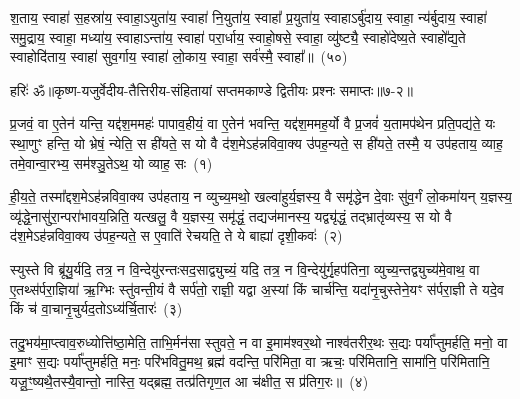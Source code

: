 श॒ताय॒ स्वाहा॑ स॒हस्रा॑य॒ स्वाहा॒\-ऽयुता॑य॒ स्वाहा॑ नि॒युता॑य॒ स्वाहा᳚ प्र॒युता॑य॒ स्वाहा\-ऽर्बु॑दाय॒ स्वाहा॒ न्य॑र्बुदाय॒ स्वाहा॑ समु॒द्राय॒ स्वाहा॒ मध्या॑य॒ स्वाहा\-ऽन्ता॑य॒ स्वाहा॑ परा॒र्धाय॒ स्वाहो॒षसे॒ स्वाहा॒ व्यु॑ष्ट्यै॒ स्वाहो॑देष्य॒ते स्वाहो᳚द्य॒ते स्वाहोदि॑ताय॒ स्वाहा॑ सुव॒र्गाय॒ स्वाहा॑ लो॒काय॒ स्वाहा॒ सर्व॑स्मै॒ स्वाहा᳚॥~(५०)

{\anuvakamend[{श॒ताया॒ष्टात्रिꣳ॑शत्}]}%


{हरिः॑ ॐ}{॥कृष्ण-यजुर्वेदीय-तैत्तिरीय-संहितायां सप्तमकाण्डे द्वितीयः प्रश्नः समाप्तः॥७-२॥}

\setcounter{anuvakam}{0}
प्र॒जवं॒ वा ए॒तेन॑ यन्ति॒ यद्द॑श॒ममहः॑ पापाव॒हीयं॒ वा ए॒तेन॑ भवन्ति॒ यद्द॑श॒ममह॒र्यो वै प्र॒जवं॑ य॒तामप॑थेन प्रति॒पद्य॑ते॒ यः स्था॒णुꣳ हन्ति॒ यो भ्रेषं॒ न्येति॒ स ही॑यते॒ स यो वै द॑श॒मे\-ऽह॑न्नविवा॒क्य उ॑पह॒न्यते॒ स ही॑यते॒ तस्मै॒ य उप॑हताय॒ व्याह॒ तमे॒वान्वा॒रभ्य॒ सम॑श्ञु॒ते\-ऽथ॒ यो व्याह॒ सः~(१)

ही॒य॒ते॒ तस्मा᳚द्दश॒मे\-ऽह॑न्नविवा॒क्य उप॑हताय॒ न व्युच्य॒मथो॒ खल्वा॑हुर्य॒ज्ञस्य॒ वै समृ॑द्धेन दे॒वाः सु॑व॒र्गं लो॒कमा॑यन् य॒ज्ञस्य॒ व्यृ॑द्धे॒नासु॑रा॒न्परा॑भावय॒न्निति॒ यत्खलु॒ वै य॒ज्ञस्य॒ समृ॑द्धं॒ तद्यज॑मानस्य॒ यद्व्यृ॑द्धं॒ तद्भ्रातृ॑व्यस्य॒ स यो वै द॑श॒मे\-ऽह॑न्नविवा॒क्य उ॑पह॒न्यते॒ स ए॒वाति॑ रेचयति॒ ते ये बाह्या॑ दृशी॒कवः॑~(२)

स्युस्ते वि ब्रू॑यु॒र्यदि॒ तत्र॒ न वि॒न्देयु॑रन्तःसद॒साद्व्युच्यं॒ यदि॒ तत्र॒ न वि॒न्देयु॑र्गृ॒हप॑तिना॒ व्युच्य॒न्तद्व्युच्य॑मे॒वाथ॒ वा ए॒तथ्स॑र्परा॒ज्ञिया॑ ऋ॒ग्भिः स्तु॑वन्ती॒यं वै सर्प॑तो॒ राज्ञी॒ यद्वा अ॒स्यां किं चार्च॑न्ति॒ यदा॑नृ॒चुस्तेने॒यꣳ स॑र्परा॒ज्ञी ते यदे॒व किं च॑ वा॒चानृ॒चुर्यद॒तो\-ऽध्य॑र्चि॒तारः॑~(३)

तदु॒भय॑मा॒प्त्वाव॒रुध्योत्ति॑ष्ठा॒मेति॒ ताभि॒र्मन॑सा स्तुवते॒ न वा इ॒माम॑श्वर॒थो नाश्व॑तरीर॒थः स॒द्यः पर्या᳚प्तुमर्\mbox{}हति॒ मनो॒ वा इ॒माꣳ स॒द्यः पर्या᳚प्तुमर्\mbox{}हति॒ मनः॒ परि॑भवितु॒मथ॒ ब्रह्म॑ वदन्ति॒ परि॑मिता॒ वा ऋचः॒ परि॑मितानि॒ सामा॑नि॒ परि॑मितानि॒ यजू॒ꣳ॒ष्यथै॒तस्यै॒वान्तो॒ नास्ति॒ यद्ब्रह्म॒ तत्प्र॑तिगृण॒त आ च॑क्षीत॒ स प्र॑तिग॒रः॥~(४)

